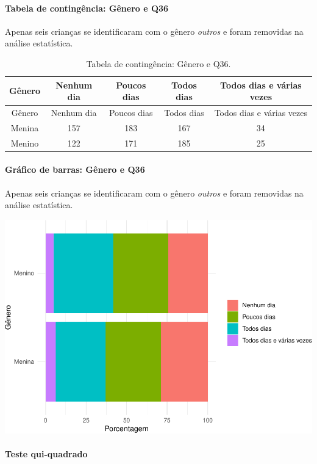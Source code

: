 \documentclass[]{article}
\let\oldparagraph\paragraph
\renewcommand{\paragraph}[1]{\oldparagraph{#1}\mbox{}}
\begin{document}
\cleardoublepage

\hypertarget{tabela-de-continguxeancia-guxeanero-e-q36}{%
\paragraph{Tabela de contingência: Gênero e Q36}\label{tabela-de-continguxeancia-guxeanero-e-q36}}

Apenas seis crianças se identificaram com o gênero \emph{outros} e foram removidas na análise estatística.

\begin{longtable}[]{@{}ccccc@{}}
\caption{\label{tab:unnamed-chunk-1320}Tabela de contingência: Gênero e Q36.}\tabularnewline
\toprule
Gênero & Nenhum dia & Poucos dias & Todos dias & Todos dias e várias vezes\tabularnewline
\midrule
\endfirsthead
\toprule
Gênero & Nenhum dia & Poucos dias & Todos dias & Todos dias e várias vezes\tabularnewline
\midrule
\endhead
Menina & 157 & 183 & 167 & 34\tabularnewline
Menino & 122 & 171 & 185 & 25\tabularnewline
\bottomrule
\end{longtable}

\hypertarget{gruxe1fico-de-barras-guxeanero-e-q36}{%
\paragraph{Gráfico de barras: Gênero e Q36}\label{gruxe1fico-de-barras-guxeanero-e-q36}}

Apenas seis crianças se identificaram com o gênero \emph{outros} e foram removidas na análise estatística.

\begin{center}\includegraphics[width=0.75\linewidth]{relatorio_covid19_files/figure-latex/unnamed-chunk-1321-1} \end{center}

\hypertarget{teste-qui-quadrado-113}{%
\paragraph{Teste qui-quadrado}\label{teste-qui-quadrado-113}}
\end{document}
